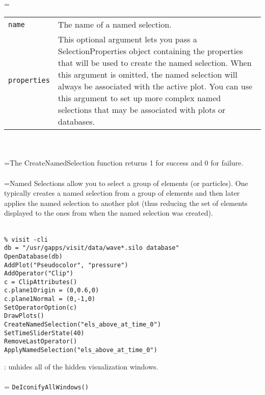 \documentclass[10pt,a4paper]{report}
\begin{document}
 \\ 
\hangindent=\parindent 
\begin{tabular}{lp{9cm}}
\verb!name! & The name of a named selection. \\
\verb!properties! & This optional argument lets you pass a SelectionProperties object containing the properties that will be used to create the named selection. When this argument is omitted, the named selection will always be associated with the active plot. You can use this argument to set up more complex named selections that may be associated with plots or databases. \\
\end{tabular} \\[-2mm]


 \\ 
\hangindent=\parindent The CreateNamedSelection function returns 1 for success and 0 for failure. \\[-3mm] 

 \\ 
\hangindent=\parindent Named Selections allow you to select a group of elements (or particles). One typically creates a named selection from a group of elements and then later applies the named selection to another plot (thus reducing the set of elements displayed to the ones from when the named selection was created). \\[-3mm] 

\\[-6mm]
\begin{verbatim}% visit -cli
db = "/usr/gapps/visit/data/wave*.silo database"
OpenDatabase(db)
AddPlot("Pseudocolor", "pressure")
AddOperator("Clip")
c = ClipAttributes()
c.plane1Origin = (0,0.6,0)
c.plane1Normal = (0,-1,0)
SetOperatorOption(c)
DrawPlots()
CreateNamedSelection("els_above_at_time_0")
SetTimeSliderState(40)
RemoveLastOperator()
ApplyNamedSelection("els_above_at_time_0")
\end{verbatim}
\newpage


{}
: unhides all of the hidden visualization windows.\\[-3mm]

 \\ 
\hangindent=\parindent 
\verb!DeIconifyAllWindows()!\\ [-3mm]
\end{document}
